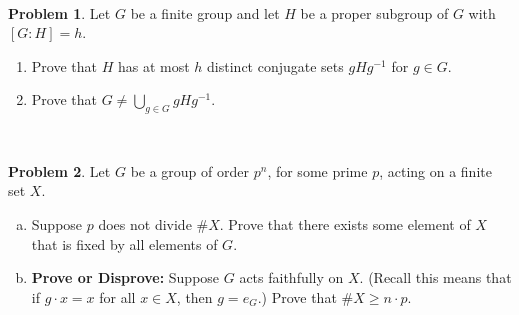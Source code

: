 \documentclass[11pt]{article}
\theoremstyle{definition}
\newtheorem{problem}{Problem}
\begin{document}
\


\begin{problem}
	Let $G$ be a finite group and let $H$ be a proper subgroup of $G$ with $[G:H]=h$. 
\begin{enumerate}
\item Prove that $H$ has at most $h$ distinct conjugate sets  $gHg^{-1}$ for $g\in G$.
\item
Prove that $G\neq \bigcup_{g\in G}  gHg^{-1}$.
\end{enumerate}
\end{problem}

\

\begin{problem} Let $G$ be a group of order $p^n$, for some prime $p$, acting on a finite set $X$.
  \begin{enumerate}[(a)]
    \item Suppose $p$ does not divide $\# X$. Prove that there exists some element of $X$ that is fixed by all elements of $G$.
      \item \textbf{Prove or Disprove:} Suppose $G$ acts faithfully on $X$. (Recall this means that if $g \cdot x = x$ for all $x \in X$, then $g = e_G$.)  Prove that $\# X \geq n \cdot p$.
      \end{enumerate}
\end{problem}
\end{document}
